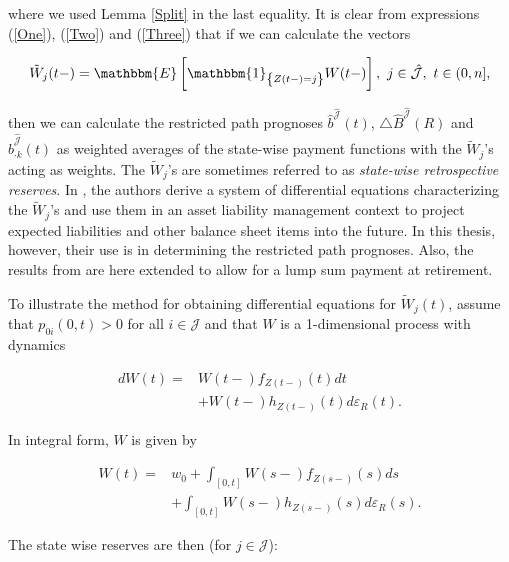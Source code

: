 \documentclass{article}
\newcommand{\1}[1]{\mathbbm{1}_{\left\lbrace #1 \right\rbrace}}
\newcommand{\expec}[1][def]{\mathbbm{E} \left[ #1 \right]}
\theoremstyle{break}
\theoremstyle{remark}
\numberwithin{equation}{section}
\begin{document}
where we used Lemma \ref{Split} in the last equality. It is clear from expressions (\ref{One}), (\ref{Two}) and (\ref{Three}) that if we can calculate the vectors

\begin{align*}
\tilde{W}_j(t-) = \expec[\1{Z(t-)=j} W(t-)], \, \, j \in \hat{\mathcal{J}}, \, \, t \in (0,n],
\end{align*}


then we can calculate the restricted path prognoses $\hat{b}^{\hat{\mathcal{J}}}(t)$, $\triangle \hat{B}^{\hat{\mathcal{J}}}(R)$ and $\hat{b}_{\cdot k}^{\hat{\mathcal{J}}}(t)$ as weighted averages of the state-wise payment functions with the $\tilde{W}_j$'s acting as weights. The $\tilde{W}_j$'s are sometimes referred to as \textit{state-wise retrospective reserves}. In \cite{Lollike}, the authors derive a system of differential equations characterizing the $\tilde{W}_j$'s and use them in an asset liability management context to project expected liabilities and other balance sheet items into the future. In this thesis, however, their use is in determining the restricted path prognoses. Also, the results from \cite{Lollike} are here extended to allow for a lump sum payment at retirement.

To illustrate the method for obtaining differential equations for $\tilde{W}_j(t)$, assume that $p_{0i}(0,t)>0$ for all $i \in \mathcal{J}$ and that $W$ is a 1-dimensional process with dynamics

\begin{align*}
	dW(t) =& W(t-) f_{Z(t-)}(t) dt \\
	&+ W(t-) h_{Z(t-)}(t) d \varepsilon_{R}(t).
\end{align*}

In integral form, $W$ is given by

\begin{align*}
	W(t) =& w_0 + \int_{\left[ 0,t \right]} W(s-) f_{Z(s-)}(s) ds \\
	&+ \int_{\left[ 0,t \right]} W(s-) h_{Z(s-)}(s) d \varepsilon_{R}(s).
\end{align*}

The state wise reserves are then (for $j \in \mathcal{J}$):
\end{document}
